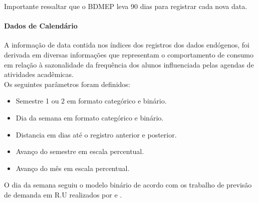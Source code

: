 \documentclass[	12pt, Times, openright, twoside, a4paper, english, brazil]{abntex2}
\begin{document}
            	Importante ressaltar que o BDMEP leva 90 dias para registrar cada nova data.
            	
        	\paragraph{Dados de Calendário}
            	A informação de data contida nos índices dos registros dos dados endógenos, foi derivada em diversas informações que representam o comportamento de consumo em relação à sazonalidade da frequência dos alunos influenciada pelas agendas de atividades acadêmicas.\\
            	Os seguintes parâmetros foram definidos:
            	\begin{itemize}
            	    \item Semestre 1 ou 2 em formato categórico e binário.
            	    \item Dia da semana em formato categórico e binário.
            	    \item Distancia em dias até o registro anterior e posterior.
            	    \item Avanço do semestre em escala percentual.
            	    \item Avanço do mês em escala percentual.
            	\end{itemize}
            	
            	O dia da semana seguiu o modelo binário de acordo com os trabalho de previsão de demanda em R.U realizados por \cite{Lopes2008} e \cite{Rocha2011}.
        
                \begin{figure}[H]
                \end{figure}
                
\end{document}
